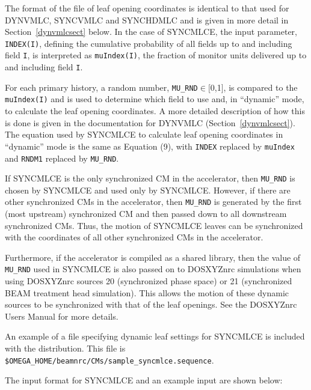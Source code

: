 \documentclass[12pt,twoside]{article}
\begin{document}
The format of the file of leaf opening coordinates is identical to that
used for DYNVMLC, SYNCVMLC and SYNCHDMLC and is given in more detail in
Section~\ref{dynvmlcsect} below.  In the case of SYNCMLCE, the input parameter, {\tt INDEX(I)}, defining
the cumulative probability of all fields up to and including field {\tt I}, is interpreted as {\tt muIndex(I)},
the fraction of monitor units delivered up to and including field {\tt I}.

For each primary history, a random number, {\tt MU\_RND}$\in[$0,1$]$, is compared to the
{\tt muIndex(I)} and is used to determine which field to use and, in ``dynamic'' mode, to calculate
the leaf opening coordinates.  A more detailed description of how this is done is given
in the documentation for DYNVMLC (Section~\ref{dynvmlcsect}). The equation used by SYNCMLCE to calculate
leaf opening coordinates in ``dynamic'' mode is the same as Equation (9), with {\tt INDEX} replaced
by {\tt muIndex} and {\tt RNDM1} replaced by {\tt MU\_RND}.

If SYNCMLCE is the only synchronized
CM in the accelerator, then {\tt MU\_RND} is chosen by SYNCMLCE and used only by SYNCMLCE.  However,
if there are other synchronized CMs in the accelerator, then {\tt MU\_RND} is generated by the
first (most upstream) synchronized CM and then passed down to all downstream synchronized CMs.  Thus,
the motion of SYNCMLCE leaves can be synchronized with the coordinates of all other synchronized CMs in
the accelerator.

Furthermore, if the accelerator is compiled as a shared library, then the value of {\tt MU\_RND} used
in SYNCMLCE is also passed on to DOSXYZnrc simulations
when using DOSXYZnrc sources 20 (synchronized phase space) or 21 (synchronized BEAM treatment head simulation).  This
allows the motion of these dynamic sources to be synchronized with that of the leaf openings.  See the
DOSXYZnrc Users Manual\cite{Wa05} for more details.

An example of a file specifying dynamic leaf settings for SYNCMLCE
is included with the distribution.  This file is {\tt \$OMEGA\_HOME/beamnrc/CMs/sample\_syncmlce.sequence}.

The input format for SYNCMLCE and an example input are shown below:
\begin{small}

\end{small}
\end{document}
